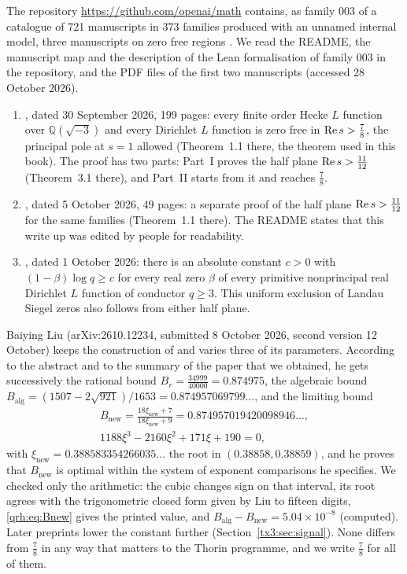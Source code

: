 The repository \url{https://github.com/openai/math} contains, as family 003 of a catalogue of 721 manuscripts in 373 families produced with an unnamed internal model, three manuscripts on zero free regions \cite{OAI26a,OAI26b,NCOAI26c}. We read the README, the manuscript map and the description of the Lean formalisation of family 003 in the repository, and the PDF files of the first two manuscripts (accessed 28 October 2026).
\begin{enumerate}
\item \cite{OAI26a}, dated 30 September 2026, 199 pages: every finite order Hecke $L$ function over $\mathbb Q(\sqrt{-3})$ and every Dirichlet $L$ function is zero free in $\operatorname{Re} s>\frac78$, the principal pole at $s=1$ allowed (Theorem~1.1 there, the theorem used in this book). The proof has two parts: Part~I proves the half plane $\operatorname{Re} s>\frac{11}{12}$ (Theorem~3.1 there), and Part~II starts from it and reaches $\frac78$.
\item \cite{OAI26b}, dated 5 October 2026, 49 pages: a separate proof of the half plane $\operatorname{Re} s>\frac{11}{12}$ for the same families (Theorem~1.1 there). The README states that this write up was edited by people for readability.
\item \cite{NCOAI26c}, dated 1 October 2026: there is an absolute constant $c>0$ with $(1-\beta)\log q\ge c$ for every real zero $\beta$ of every primitive nonprincipal real Dirichlet $L$ function of conductor $q\ge3$. This uniform exclusion of Landau Siegel zeros also follows from either half plane.
\end{enumerate}
Baiying Liu \cite{Liu26a} (arXiv:2610.12234, submitted 8 October 2026, second version 12 October) keeps the construction of \cite{OAI26a} and varies three of its parameters. According to the abstract and to the summary of the paper that we obtained, he gets successively the rational bound $B_r=\frac{34999}{40000}=0.874975$, the algebraic bound $B_{\mathrm{alg}}=(1507-2\sqrt{921})/1653=0.874957069799\ldots$, and the limiting bound
\begin{equation}\label{qrh:eq:Bnew}
\begin{gathered}B_{\mathrm{new}}=\frac{18\xi_{\mathrm{new}}+7}{18\xi_{\mathrm{new}}+9}=0.874957019420098946\ldots,\\ 1188\xi^3-2160\xi^2+171\xi+190=0,\end{gathered}
\end{equation}
with $\xi_{\mathrm{new}}=0.388583354266035\ldots$ the root in $(0.38858,0.38859)$, and he proves that $B_{\mathrm{new}}$ is optimal within the system of exponent comparisons he specifies. We checked only the arithmetic: the cubic changes sign on that interval, its root agrees with the trigonometric closed form given by Liu to fifteen digits, \eqref{qrh:eq:Bnew} gives the printed value, and $B_{\mathrm{alg}}-B_{\mathrm{new}}=5.04\times10^{-8}$ (computed). Later preprints lower the constant further (Section~\ref{tx3:sec:signal}). None differs from $\frac78$ in any way that matters to the Thorin programme, and we write $\frac78$ for all of them.
